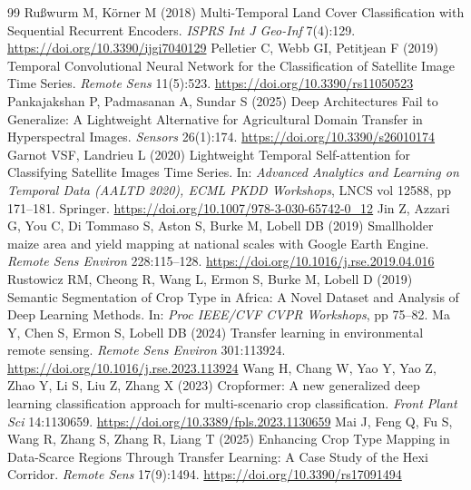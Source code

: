 \documentclass[journal]{IEEEtran}
\begin{document}
\begin{thebibliography}{99}
Ru\ss{}wurm M, K\"orner M (2018) Multi-Temporal Land Cover Classification with Sequential Recurrent Encoders. \textit{ISPRS Int J Geo-Inf} 7(4):129. \href{https://doi.org/10.3390/ijgi7040129}{https://doi.org/10.3390/ijgi7040129}
Pelletier C, Webb GI, Petitjean F (2019) Temporal Convolutional Neural Network for the Classification of Satellite Image Time Series. \textit{Remote Sens} 11(5):523. \href{https://doi.org/10.3390/rs11050523}{https://doi.org/10.3390/rs11050523}
Pankajakshan P, Padmasanan A, Sundar S (2025) Deep Architectures Fail to Generalize: A Lightweight Alternative for Agricultural Domain Transfer in Hyperspectral Images. \textit{Sensors} 26(1):174. \href{https://doi.org/10.3390/s26010174}{https://doi.org/10.3390/s26010174}
Garnot VSF, Landrieu L (2020) Lightweight Temporal Self-attention for Classifying Satellite Images Time Series. In: \textit{Advanced Analytics and Learning on Temporal Data (AALTD 2020), ECML PKDD Workshops}, LNCS vol 12588, pp 171--181. Springer. \href{https://doi.org/10.1007/978-3-030-65742-0_12}{https://doi.org/10.1007/978-3-030-65742-0\_12}
Jin Z, Azzari G, You C, Di Tommaso S, Aston S, Burke M, Lobell DB (2019) Smallholder maize area and yield mapping at national scales with Google Earth Engine. \textit{Remote Sens Environ} 228:115--128. \href{https://doi.org/10.1016/j.rse.2019.04.016}{https://doi.org/10.1016/j.rse.2019.04.016}
Rustowicz RM, Cheong R, Wang L, Ermon S, Burke M, Lobell D (2019) Semantic Segmentation of Crop Type in Africa: A Novel Dataset and Analysis of Deep Learning Methods. In: \textit{Proc IEEE/CVF CVPR Workshops}, pp 75--82.
Ma Y, Chen S, Ermon S, Lobell DB (2024) Transfer learning in environmental remote sensing. \textit{Remote Sens Environ} 301:113924. \href{https://doi.org/10.1016/j.rse.2023.113924}{https://doi.org/10.1016/j.rse.2023.113924}
Wang H, Chang W, Yao Y, Yao Z, Zhao Y, Li S, Liu Z, Zhang X (2023) Cropformer: A new generalized deep learning classification approach for multi-scenario crop classification. \textit{Front Plant Sci} 14:1130659. \href{https://doi.org/10.3389/fpls.2023.1130659}{https://doi.org/10.3389/fpls.2023.1130659}
Mai J, Feng Q, Fu S, Wang R, Zhang S, Zhang R, Liang T (2025) Enhancing Crop Type Mapping in Data-Scarce Regions Through Transfer Learning: A Case Study of the Hexi Corridor. \textit{Remote Sens} 17(9):1494. \href{https://doi.org/10.3390/rs17091494}{https://doi.org/10.3390/rs17091494}

\end{thebibliography}
\end{document}
